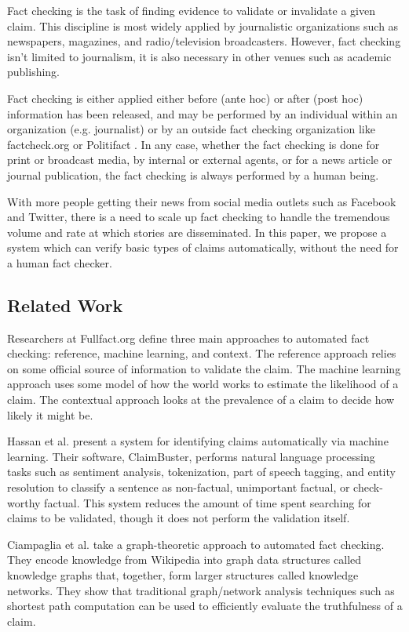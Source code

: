 \documentclass{chi2009}
\begin{document}
Fact checking is the task of finding evidence to validate or invalidate a given claim. This discipline is most widely applied by journalistic organizations such as newspapers, magazines, and radio/television broadcasters.  However, fact checking isn't limited to journalism, it is also necessary in other venues such as academic publishing.  

Fact checking is either applied either before (ante hoc) or after (post hoc) information has been released, and may be performed by an individual within an organization (e.g. journalist) or by an outside fact checking organization like factcheck.org \cite{factcheck} or Politifact \cite{politifact}.  In any case, whether the fact checking is done for print or broadcast media, by internal or external agents, or for a news article or journal publication, the fact checking is always performed by a human being.  

With more people getting their news from social media outlets such as Facebook and Twitter, there is a need to scale up fact checking to handle the tremendous volume and rate at which stories are disseminated.  In this paper, we propose a system which can verify basic types of claims automatically, without the need for a human fact checker.

\subsection{Related Work}
Researchers at Fullfact.org \cite{babakar_moy_2016} define three main approaches to automated fact checking: reference, machine learning, and context.  The reference approach relies on some official source of information to validate the claim.  The machine learning approach uses some model of how the world works to estimate the likelihood of a claim.  The contextual approach looks at the prevalence of a claim to decide how likely it might be.

Hassan et al. \cite{hassan2015quest} present a system for identifying claims automatically via machine learning.  Their software, ClaimBuster, performs natural language processing tasks such as sentiment analysis, tokenization, part of speech tagging, and entity resolution to classify a sentence as non-factual, unimportant factual, or check-worthy factual.  This system reduces the amount of time spent searching for claims to be validated, though it does not perform the validation itself.  

Ciampaglia et al. \cite{ciampaglia2015computational} take a graph-theoretic approach to automated fact checking.  They encode knowledge from Wikipedia into graph data structures called knowledge graphs that, together, form larger structures called knowledge networks.  They show that traditional graph/network analysis techniques such as shortest path computation can be used to efficiently evaluate the truthfulness of a claim.
\end{document}
